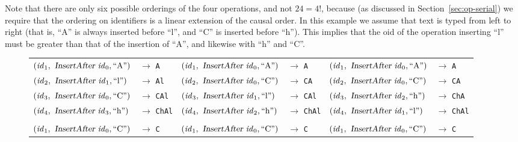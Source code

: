 Note that there are only six possible orderings of the four operations, and not $24 = 4!$, because (as discussed in Section~\ref{sec:op-serial}) we require that the ordering on identifiers is a linear extension of the causal order.
In this example we assume that text is typed from left to right (that is, ``A'' is always inserted before ``l'', and ``C'' is inserted before ``h'').
This implies that the oid of the operation inserting ``l'' must be greater than that of the insertion of ``A'', and likewise with ``h'' and ``C''.

\begin{figure}
\setlength{\tabcolsep}{3pt}
\begin{tabular}{ll|ll|ll}
$(\mathit{id}_1, \isa{InsertAfter } \mathit{id}_0, \text{``A''})$ & $\rightarrow$ \texttt{A} &
$(\mathit{id}_1, \isa{InsertAfter } \mathit{id}_0, \text{``A''})$ & $\rightarrow$ \texttt{A} &
$(\mathit{id}_1, \isa{InsertAfter } \mathit{id}_0, \text{``A''})$ & $\rightarrow$ \texttt{A} \\
$(\mathit{id}_2, \isa{InsertAfter } \mathit{id}_1, \text{``l''})$ & $\rightarrow$ \texttt{Al} &
$(\mathit{id}_2, \isa{InsertAfter } \mathit{id}_0, \text{``C''})$ & $\rightarrow$ \texttt{CA} &
$(\mathit{id}_2, \isa{InsertAfter } \mathit{id}_0, \text{``C''})$ & $\rightarrow$ \texttt{CA} \\
$(\mathit{id}_3, \isa{InsertAfter } \mathit{id}_0, \text{``C''})$ & $\rightarrow$ \texttt{CAl} &
$(\mathit{id}_3, \isa{InsertAfter } \mathit{id}_1, \text{``l''})$ & $\rightarrow$ \texttt{CAl} &
$(\mathit{id}_3, \isa{InsertAfter } \mathit{id}_2, \text{``h''})$ & $\rightarrow$ \texttt{ChA} \\
$(\mathit{id}_4, \isa{InsertAfter } \mathit{id}_3, \text{``h''})$ & $\rightarrow$ \texttt{ChAl} &
$(\mathit{id}_4, \isa{InsertAfter } \mathit{id}_2, \text{``h''})$ & $\rightarrow$ \texttt{ChAl} &
$(\mathit{id}_4, \isa{InsertAfter } \mathit{id}_1, \text{``l''})$ & $\rightarrow$ \texttt{ChAl} \\[6pt] \hline &&&&&\\[-6pt]
$(\mathit{id}_1, \isa{InsertAfter } \mathit{id}_0, \text{``C''})$ & $\rightarrow$ \texttt{C} &
$(\mathit{id}_1, \isa{InsertAfter } \mathit{id}_0, \text{``C''})$ & $\rightarrow$ \texttt{C} &
$(\mathit{id}_1, \isa{InsertAfter } \mathit{id}_0, \text{``C''})$ & $\rightarrow$ \texttt{C} \\

\end{tabular}
\end{figure}
